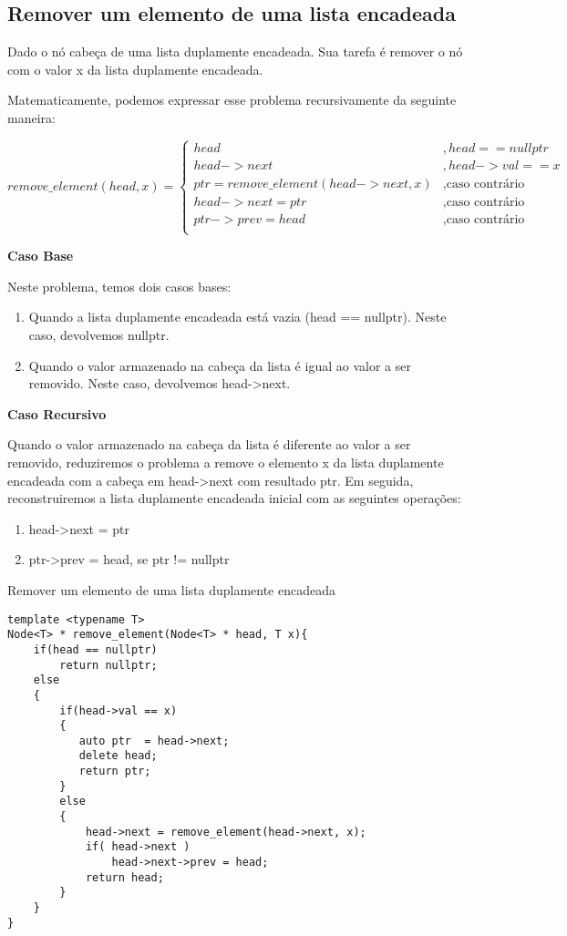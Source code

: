 \subsection{Remover um elemento de uma lista encadeada}

Dado o nó cabeça de uma lista duplamente encadeada. Sua tarefa é
remover o nó com o valor x da lista duplamente encadeada.

Matematicamente, podemos expressar esse problema recursivamente da seguinte maneira:


\begin{equation}
remove\_element(head, x) = 
\begin{cases}
head            & , head == nullptr\\
head->next      & , head->val == x\\
ptr = remove\_element(head->next, x) & , \text{caso contrário}\\
head->next = ptr & , \text{caso contrário}\\
ptr->prev = head & , \text{caso contrário}\\
\end{cases}
\end{equation}

\textbf{Caso Base}

Neste problema, temos dois casos bases:

\begin{enumerate}
    \item Quando a lista duplamente encadeada está vazia (head == nullptr). Neste caso, devolvemos nullptr.
    \item Quando o valor armazenado na cabeça da lista é igual ao valor a ser removido. Neste caso, devolvemos head->next.  
\end{enumerate}

\textbf{Caso Recursivo}

Quando o valor armazenado na cabeça da lista é diferente ao valor a ser removido, reduziremos o problema a remove o elemento x da lista duplamente encadeada com a cabeça em head->next com resultado ptr. Em seguida, reconstruiremos a lista duplamente encadeada inicial com as seguintes operações:

\begin{enumerate}
    \item head->next = ptr
    \item ptr->prev  = head, se ptr != nullptr
\end{enumerate}

\begin{listing}[!ht]
\caption{Remover um elemento de uma lista duplamente encadeada}
\begin{verbatim}
template <typename T>
Node<T> * remove_element(Node<T> * head, T x){
    if(head == nullptr)
        return nullptr;
    else
    {
        if(head->val == x)
        {
           auto ptr  = head->next;
           delete head;
           return ptr;
        }
        else
        {
            head->next = remove_element(head->next, x);
            if( head->next )
                head->next->prev = head;
            return head;
        }
    }
}
\end{verbatim}
\end{listing}

